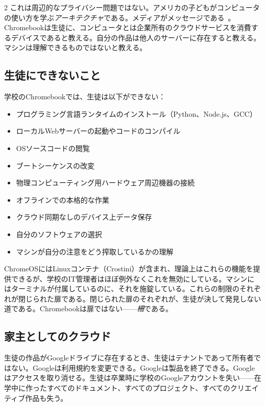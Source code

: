 \documentclass[11pt, a4paper]{article}
\begin{document}
\begin{multicols}{2}
これは周辺的なプライバシー問題ではない。アメリカの子どもがコンピュータの使い方を学ぶ\emph{アーキテクチャ}である。メディアがメッセージである~\citep{mcluhan1964understanding}。Chromebookは生徒に、コンピュータとは企業所有のクラウドサービスを消費するデバイスであると教える。自分の作品は他人のサーバーに存在すると教える。マシンは理解できるものではないと教える。

\subsection{生徒にできないこと}

学校のChromebookでは、生徒は以下ができない：

\begin{itemize}
  \item プログラミング言語ランタイムのインストール（Python、Node.js、GCC）
  \item ローカルWebサーバーの起動やコードのコンパイル
  \item OSソースコードの閲覧
  \item ブートシーケンスの改変
  \item 物理コンピューティング用ハードウェア周辺機器の接続
  \item オフラインでの本格的な作業
  \item クラウド同期なしのデバイス上データ保存
  \item 自分のソフトウェアの選択
  \item マシンが自分の注意をどう搾取しているかの理解
\end{itemize}

ChromeOSにはLinuxコンテナ（Crostini）が含まれ、理論上はこれらの機能を提供できるが、学校のIT管理者はほぼ例外なくこれを無効にしている。マシンにはターミナルが付属しているのに、それを施錠している。これらの制限のそれぞれが閉じられた扉である。閉じられた扉のそれぞれが、生徒が決して発見しない道である。Chromebookは扉ではない——\emph{柵}である。

\subsection{家主としてのクラウド}

生徒の作品がGoogleドライブに存在するとき、生徒はテナントであって所有者ではない。Googleは利用規約を変更できる。Googleは製品を終了できる。Googleはアクセスを取り消せる。生徒は卒業時に学校のGoogleアカウントを失い——在学中に作ったすべてのドキュメント、すべてのプロジェクト、すべてのクリエイティブ作品も失う。


\end{multicols}
\end{document}
